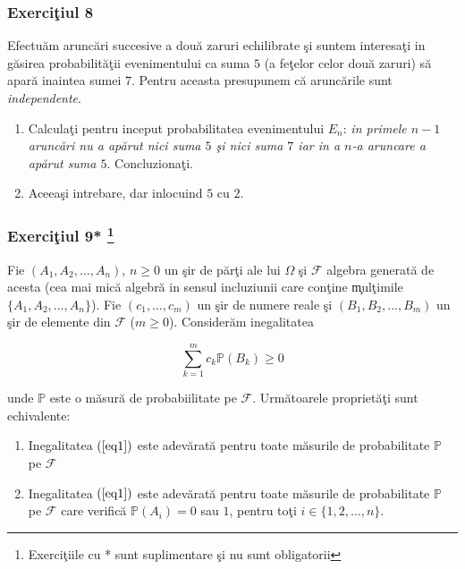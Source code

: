 \documentclass[]{article}
\def\Om{\Omega}
\def\PP{{\mathbb P}}
\def\MF{{\mathcal F}}
\let\rmarkdownfootnote\footnote%
\def\footnote{\protect\rmarkdownfootnote}
\begin{document}
\subsubsection{\texorpdfstring{Exerci\c tiul
8}{Exerciiul 8}}\label{exerciiul-8}

Efectu\u am arunc\u ari succesive a dou\u a zaruri echilibrate \c si
suntem interesa\c ti in g\u asirea probabilit\u a\c tii evenimentului ca
suma \(5\) (a fe\c telor celor dou\u a zaruri) s\u a apar\u a inaintea
sumei \(7\). Pentru aceasta presupunem c\u a arunc\u arile sunt
\emph{independente}.

\begin{enumerate}
\def\labelenumi{\arabic{enumi}.}
\item
  Calcula\c ti pentru inceput probabilitatea evenimentului \(E_n\):
  \emph{in primele \(n-1\) arunc\u ari nu a ap\u arut nici suma \(5\)
  \c si nici suma \(7\) iar in a \(n\)-a aruncare a ap\u arut suma
  \(5\)}. Concluziona\c ti.
\item
  Aceea\c si intrebare, dar inlocuind \(5\) cu \(2\).
\end{enumerate}

\subsubsection[Exerci\c tiul 9* ]{\texorpdfstring{Exerci\c tiul 9*
\footnote{Exerci\c tiile cu * sunt suplimentare \c si nu sunt
  obligatorii}}{Exerciiul 9* }}\label{exerciiul-9}

Fie \((A_1, A_2, \dots, A_n)\), \(n\geq0\) un \c sir de p\u ar\c ti ale
lui \(\Om\) \c si \(\MF\) algebra generat\u a de acesta (cea mai mic\u a
algebr\u a in sensul incluziunii care con\c tine \c mul\c timile
\(\{A_1, A_2, \dots, A_n\}\)). Fie \((c_1, \dots,c_m)\) un \c sir de
numere reale \c si \((B_1, B_2, \dots, B_m)\) un \c sir de elemente din
\(\MF\) (\(m\geq 0\)). Consider\u am inegalitatea

\begin{equation}\label{eq1}
  \displaystyle\sum_{k=1}^{m}c_k\PP(B_k)\geq 0
\end{equation}

unde \(\PP\) este o m\u asur\u a de probabiilitate pe \(\MF\).
Urm\u atoarele propriet\u a\c ti sunt echivalente:

\begin{enumerate}
\def\labelenumi{\alph{enumi})}
\item
  Inegalitatea \((\ref{eq1})\) este adev\u arat\u a pentru toate
  m\u asurile de probabilitate \(\PP\) pe \(\MF\)
\item
  Inegalitatea \((\ref{eq1})\) este adev\u arat\u a pentru toate
  m\u asurile de probabilitate \(\PP\) pe \(\MF\) care verific\u a
  \(\PP(A_i)=0\) sau \(1\), pentru to\c ti \(i\in\{1,2,\dots,n\}\).
\end{enumerate}
\end{document}
